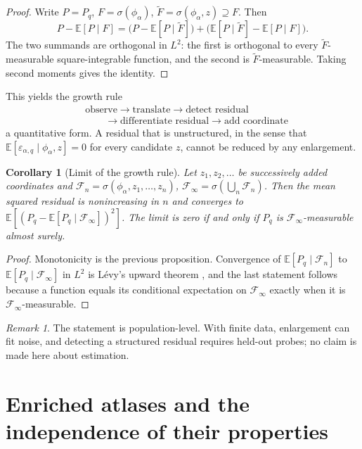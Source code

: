 \documentclass[11pt]{article}
\newtheorem{corollary}{Corollary}
\theoremstyle{remark}
\newtheorem{remark}{Remark}
\newcommand{\E}{\mathbb{E}}
\begin{document}
\begin{proof}
Write $P=P_q$, $F=\sigma(\phi_\alpha)$, $\tilde F=\sigma(\phi_\alpha,z)\supseteq F$. Then
\[
P-\E[P\mid F]=\bigl(P-\E[P\mid\tilde F]\bigr)+\bigl(\E[P\mid\tilde F]-\E[P\mid F]\bigr).
\]
The two summands are orthogonal in $L^2$: the first is orthogonal to every $\tilde F$-measurable square-integrable function, and the second is $\tilde F$-measurable. Taking second moments gives the identity.
\end{proof}

This yields the growth rule
\[
\begin{aligned}
&\text{observe}\to\text{translate}\to\text{detect residual}\\
&\qquad\to\text{differentiate residual}\to\text{add coordinate}
\end{aligned}
\]
a quantitative form. A residual that is unstructured, in the sense that $\E[\varepsilon_{\alpha,q}\mid\phi_\alpha,z]=0$ for every candidate $z$, cannot be reduced by any enlargement.

\begin{corollary}[Limit of the growth rule]\label{cor:growth}
Let $z_1,z_2,\dots$ be successively added coordinates and $\mathcal F_n=\sigma(\phi_\alpha,z_1,\dots,z_n)$, $\mathcal F_\infty=\sigma(\bigcup_n\mathcal F_n)$. Then the mean squared residual is nonincreasing in $n$ and converges to $\E[(P_q-\E[P_q\mid\mathcal F_\infty])^2]$. The limit is zero if and only if $P_q$ is $\mathcal F_\infty$-measurable almost surely.
\end{corollary}

\begin{proof}
Monotonicity is the previous proposition. Convergence of $\E[P_q\mid\mathcal F_n]$ to $\E[P_q\mid\mathcal F_\infty]$ in $L^2$ is L\'evy's upward theorem \cite{williams}, and the last statement follows because a function equals its conditional expectation on $\mathcal F_\infty$ exactly when it is $\mathcal F_\infty$-measurable.
\end{proof}

\begin{remark}
The statement is population-level. With finite data, enlargement can fit noise, and detecting a structured residual requires held-out probes; no claim is made here about estimation.
\end{remark}

\section{Enriched atlases and the independence of their properties}
\end{document}
